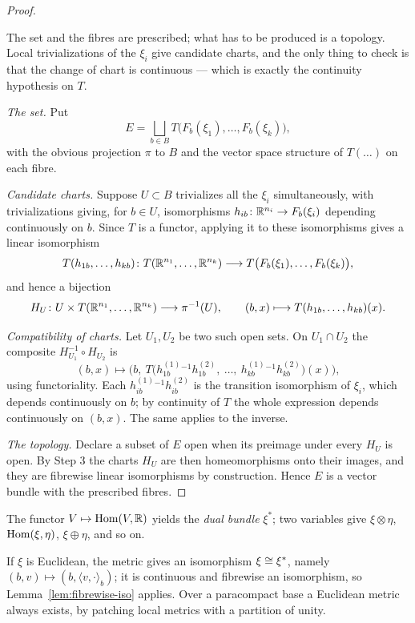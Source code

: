 \begin{proof}
\begin{strategy}
The set and the fibres are prescribed; what has to be produced is a topology.
Local trivializations of the $\xi_i$ give candidate charts, and the only thing
to check is that the change of chart is continuous --- which is exactly the
continuity hypothesis on $T$.
\end{strategy}

 \emph{The set.} Put
\[
E=\bigsqcup_{b\in B}T\big(F_b(\xi_1),\dots,F_b(\xi_k)\big),
\]
with the obvious projection $\pi$ to $B$ and the vector space structure of
$T(\dots)$ on each fibre.

 \emph{Candidate charts.} Suppose $U\subset B$ trivializes all the
$\xi_i$ simultaneously, with trivializations giving, for $b\in U$, isomorphisms
$h_{ib}\colon\mathbb{R}^{n_i}\to F_b(\xi_i)$ depending continuously on $b$. Since $T$
is a functor, applying it to these isomorphisms gives a linear isomorphism
\[
T(h_{1b},\dots,h_{kb})\colon
T(\mathbb{R}^{n_1},\dots,\mathbb{R}^{n_k})\longrightarrow
T\big(F_b(\xi_1),\dots,F_b(\xi_k)\big),
\]
and hence a bijection
\[
H_U\colon U\times T(\mathbb{R}^{n_1},\dots,\mathbb{R}^{n_k})\longrightarrow\pi^{-1}(U),
\qquad
(b,x)\longmapsto T(h_{1b},\dots,h_{kb})(x).
\]

 \emph{Compatibility of charts.} Let $U_1,U_2$ be two such open sets.
On $U_1\cap U_2$ the composite $H_{U_1}^{-1}\circ H_{U_2}$ is
\[
(b,x)\longmapsto\Big(b,\ T\big(h^{(1)}_{1b}{}^{-1}h^{(2)}_{1b},\ \dots,\
h^{(1)}_{kb}{}^{-1}h^{(2)}_{kb}\big)(x)\Big),
\]
using functoriality. Each $h^{(1)}_{ib}{}^{-1}h^{(2)}_{ib}$ is the transition
isomorphism of $\xi_i$, which depends continuously on $b$; by continuity of $T$
the whole expression depends continuously on $(b,x)$. The same applies to the
inverse.

 \emph{The topology.} Declare a subset of $E$ open when its preimage
under every $H_U$ is open. By Step 3 the charts $H_U$ are then homeomorphisms
onto their images, and they are fibrewise linear isomorphisms by construction.
Hence $E$ is a vector bundle with the prescribed fibres.
\end{proof}

\begin{example}
The functor $V\mapsto\operatorname{Hom}(V,\mathbb{R})$ yields the \emph{dual bundle} $\xi^*$; two
variables give $\xi\otimes\eta$, $\operatorname{Hom}(\xi,\eta)$, $\xi\oplus\eta$, and so on.
\end{example}

\begin{remark}
If $\xi$ is Euclidean, the metric gives an isomorphism $\xi\cong\xi^*$, namely
$(b,v)\mapsto(b,\langle v,\cdot\rangle_b)$; it is continuous and fibrewise an
isomorphism, so Lemma~\ref{lem:fibrewise-iso} applies. Over a paracompact base a
Euclidean metric always exists, by patching local metrics with a partition of
unity.
\end{remark}

